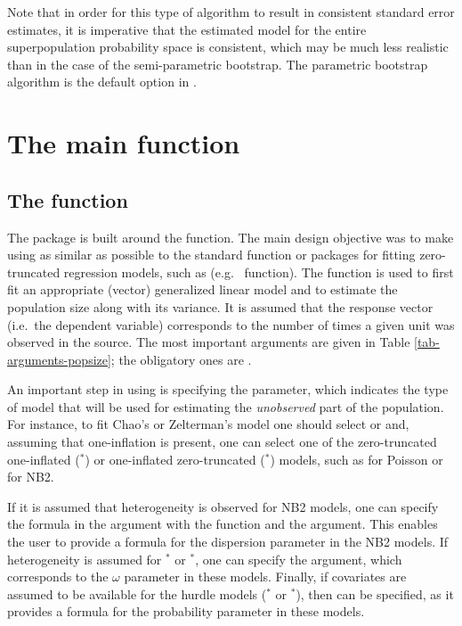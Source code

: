 \documentclass[nojss]{jss}
\newcommand{\1}{\mathcal{I}} \newcommand{\bZero}{\boldsymbol{0}}
\begin{document}
Note that in order for this type of algorithm to result in consistent
standard error estimates, it is imperative that the estimated model for
the entire superpopulation probability space is consistent, which may be
much less realistic than in the case of the semi-parametric bootstrap.
The parametric bootstrap algorithm is the default option in
.

\section{The main function}\label{sec-main}

\subsection[The estimatePopsize function]{The  function}

The  package is built around the
 function. The main design objective was to make
using  as similar as possible to the standard
 function or packages for fitting zero-truncated
regression models, such as 
(e.g.~ function). The 
function is used to first fit an appropriate (vector) generalized linear
model and to estimate the population size along with its variance. It is
assumed that the response vector (i.e.~the dependent variable)
corresponds to the number of times a given unit was observed in the
source. The most important arguments are given in Table
\ref{tab-arguments-popsize}; the obligatory ones are
.

An important step in using  is specifying the
 parameter, which indicates the type of model that will be
used for estimating the \emph{unobserved} part of the population. For
instance, to fit Chao's or Zelterman's model one should select
 or  and, assuming that one-inflation is
present, one can select one of the zero-truncated one-inflated
(\(^\ast\)) or one-inflated zero-truncated
(\(^\ast\)) models, such as  for Poisson or
 for NB2.

If it is assumed that heterogeneity is observed for NB2 models, one can
specify the formula in the  argument with the
 function and the  argument. This
enables the user to provide a formula for the dispersion parameter in
the NB2 models. If heterogeneity is assumed for \(^\ast\) or
\(^\ast\), one can specify the  argument,
which corresponds to the \(\omega\) parameter in these models. Finally,
if covariates are assumed to be available for the hurdle models
(\(^\ast\) or \(^\ast\)), then
 can be specified, as it provides a formula for the
probability parameter in these models.
\end{document}
